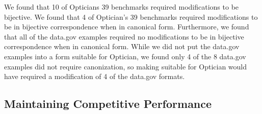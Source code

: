 \documentclass[acmsmall,review,anonymous]{acmart}
\begin{document}
We found that 10 of Opticians 39 benchmarks required modifications to be
bijective. We found that 4 of Optician's 39 benchmarks required modifications to
be in bijective correspondence when in canonical form. Furthermore, we found
that all of the data.gov examples required no modifications to be in bijective
correspondence when in canonical form. While we did not put the data.gov
examples into a form suitable for Optician, we found only 4 of the 8 data.gov
examples did not require canonization, so making suitable for Optician would
have required a modification of 4 of the data.gov formats.

\subsection{Maintaining Competitive Performance}
\end{document}
